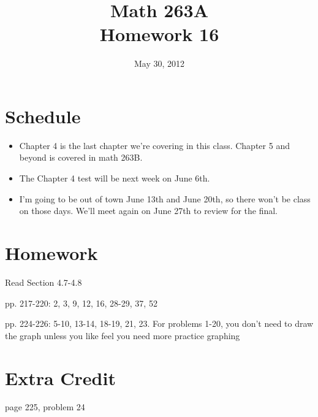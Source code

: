 \documentclass[fleqn]{exam}
\title{Math 263A \\ Homework 16}
\date{May 30, 2012}
\begin{document}
\maketitle

\ifprintanswers
\else
\section{Schedule}

\begin{itemize}
\item Chapter 4 is the last chapter we're covering in this class.  Chapter 5 and beyond is covered in math 263B.

\item The Chapter 4 test will be next week on June 6th.

\item I'm going to be out of town June 13th and June 20th, so there won't be class on those days.  We'll meet again on June
27th to review for the final. 

\end{itemize}

\fi

\section{Homework}

\begin{itemize*}
  \item Read Section 4.7-4.8
  \item pp. 217-220: 2, 3, 9, 12, 16, 28-29, 37, 52
  \item pp. 224-226: 5-10, 13-14, 18-19, 21, 23.  For problems 1-20, you don't need to draw the graph unless you like
    feel you need more practice graphing
\end{itemize*}

\ifprintanswers
\pagebreak
\fi

\section{Extra Credit}
\begin{itemize*}
\item page 225, problem 24
\end{itemize*}
\end{document}
